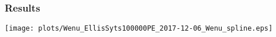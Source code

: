 \begin{frame}
		\frametitle{Results}
		\texttt{[image: plots/Wenu\_EllisSyts100000PE\_2017-12-06\_Wenu\_spline.eps]}
		
		\vspace{20pt}
		\vspace{20pt}
		
		\cend
	\end{frame}